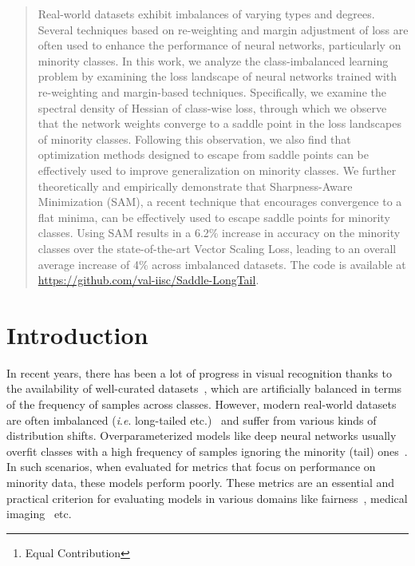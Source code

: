 \documentclass{article}
\author{Harsh Rangwani\thanks{Equal Contribution} \qquad Sumukh K Aithal\footnotemark[1]
  \qquad Mayank Mishra \qquad R. Venkatesh Babu \\
  Video Analytics Lab, Indian Institute of Science, Bengaluru, India \\ 
  \texttt{ \{harshr@iisc.ac.in, sumukhaithal6@gmail.com, }\\
  { \texttt{mayankmishra@iisc.ac.in, venky@iisc.ac.in\}}}
}
\newcommand{\ie}{\textit{i}.\textit{e}. }
\begin{document}
\maketitle
    

\begin{abstract}




Real-world datasets exhibit imbalances of varying types and degrees. Several techniques based on re-weighting and margin adjustment of loss are often used to enhance the performance of neural networks, particularly on minority classes. In this work, we analyze the class-imbalanced learning problem by examining the loss landscape of neural networks trained with re-weighting and margin-based techniques. Specifically, we examine the spectral density of Hessian of class-wise loss, through which we observe that the network weights converge to a saddle point in the loss landscapes of minority classes. Following this observation, we also find that optimization methods designed to escape from saddle points can be effectively used to improve generalization on minority classes. We further theoretically and empirically demonstrate that Sharpness-Aware Minimization (SAM), a recent technique that encourages convergence to a flat minima, can be effectively used to escape saddle points for minority classes. Using SAM results in a 6.2\% increase in accuracy on the minority classes over the state-of-the-art Vector Scaling Loss, leading to an overall average increase of 4\% across imbalanced datasets. The code is available at \href{https://github.com/val-iisc/Saddle-LongTail}{https://github.com/val-iisc/Saddle-LongTail}.





 \end{abstract}

\section{Introduction}
In recent years, there has been a lot of progress in visual recognition thanks to the availability of well-curated datasets~\cite{krizhevsky2009learning, russakovsky2015imagenet}, which are artificially balanced in terms of the frequency of samples across classes. However, modern real-world datasets are often imbalanced (\ie long-tailed etc.)~\cite{krishna2017visual, thomee2016yfcc100m, van2017devil} and suffer from various kinds of distribution shifts.  Overparameterized models like deep neural networks usually overfit classes with a high frequency of samples ignoring the minority (tail) ones~\cite{buda2018systematic, van2017devil}. In such  scenarios, when evaluated for metrics that focus on performance on minority data, these models perform poorly. These metrics are an essential and practical criterion for evaluating models in various domains like fairness~\cite{cotter2019training}, medical imaging~\cite{zhang2019medical} etc.
 
\end{document}

